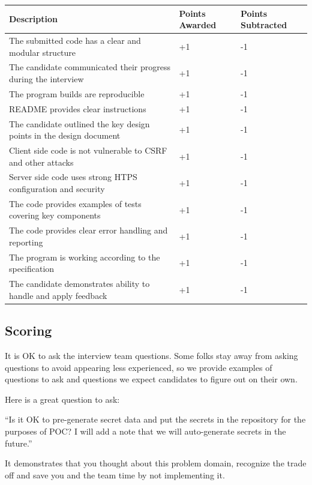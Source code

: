 \documentclass{article}
\begin{document}
\begin{center}
\begin{tabular}{ | m{25em} | m{5em}| m{5em} | }
  \hline
  \rowcolor{blue!60!black!10}
  Description & Points Awarded & Points Subtracted \\
  \hline
  The submitted code has a clear and modular structure & +1 & -1 \\
  \hline   
  The candidate communicated their progress during the interview & +1 & -1 \\
  \hline
  The program builds are reproducible & +1 & -1 \\
  \hline
  README provides clear instructions & +1 & -1 \\
  \hline
  The candidate outlined the key design points in the design document & +1 & -1 \\
  \hline
  Client side code is not vulnerable to CSRF and other attacks & +1 & -1 \\
  \hline
  Server side code uses strong HTPS configuration and security & +1 & -1 \\
  \hline  
  The code provides examples of tests covering key components & +1 & -1 \\
  \hline
  The code provides clear error handling and reporting & +1 & -1 \\
  \hline
  The program is working according to the specification & +1 & -1 \\
  \hline
  The candidate demonstrates ability to handle and apply feedback & +1 & -1 \\
  \hline
\end{tabular}
\end{center}

\subsection{Scoring}

It is OK to ask the interview team questions. Some folks stay away from
asking questions to avoid appearing less experienced, so we provide examples of questions
to ask and questions we expect candidates to figure out on their own.

Here is a great question to ask:

``Is it OK to pre-generate secret data and put the secrets in the repository for the purposes of POC? I will add a note that we will auto-generate secrets in the future.''

It demonstrates that you thought about this problem domain, recognize the trade off and save you and the team time by not implementing it.
\end{document}

